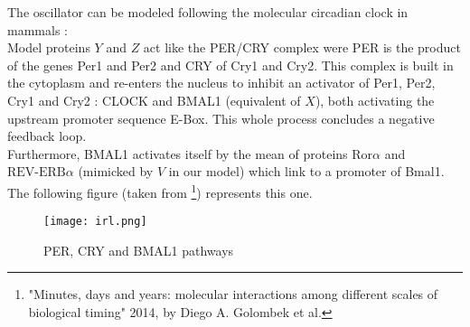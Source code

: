 The oscillator can be modeled following the molecular circadian clock in mammals : \\
Model proteins $Y$ and $Z$ act like the PER/CRY complex were PER is the product of the genes Per1 and Per2 and CRY of Cry1 and Cry2. This complex is built in the cytoplasm and re-enters the nucleus to inhibit an activator of Per1, Per2, Cry1 and Cry2 : CLOCK and BMAL1 (equivalent of $X$), both activating the upstream promoter sequence E-Box. This whole process concludes a negative feedback loop. \\
Furthermore, BMAL1 activates itself by the mean of proteins $\text{Ror}\alpha$ and $\text{REV-ERB}\alpha$ (mimicked by $V$ in our model) which link to a promoter of Bmal1.\\ 
The following figure (taken from \footnote{"Minutes, days and years: molecular interactions among different scales of biological timing" 2014, by Diego A. Golombek et al.}) represents this one.

\begin{figure}[!htb]
    \centering
    \texttt{[image: irl.png]}
    \captionsetup{labelformat=empty}
    \caption{PER, CRY and BMAL1 pathways}
\end{figure}


